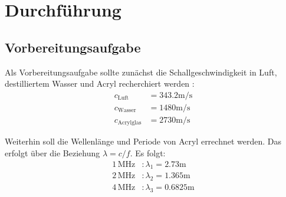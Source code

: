 \section{Durchführung}
\label{sec:Durchführung}

\subsection{Vorbereitungsaufgabe}

Als Vorbereitungsaufgabe sollte zunächst die Schallgeschwindigkeit in Luft, destilliertem Wasser und Acryl recherchiert werden \cite{schallgeschw}:
\begin{align*}
    c_\text{Luft} &= 343.2 \unit{\meter} / \unit{\second} \\
    c_\text{Wasser} &= 1480 \unit{\meter} / \unit{\second} \\
    c_\text{Acrylglas} &= 2730 \unit{\meter} / \unit{\second}
\end{align*} 

Weiterhin soll die Wellenlänge und Periode von Acryl errechnet werden. Das erfolgt über die Beziehung $\lambda = c / f$.
Es folgt:
\begin{align*}
    1 \, \unit{\mega\hertz}&: \lambda_1 =  2.73 \unit\meter\\
    2 \, \unit{\mega\hertz}&: \lambda_2 =  1.365\unit\meter\\
    4 \, \unit{\mega\hertz}&: \lambda_3 =  0.6825 \unit\meter
\end{align*}